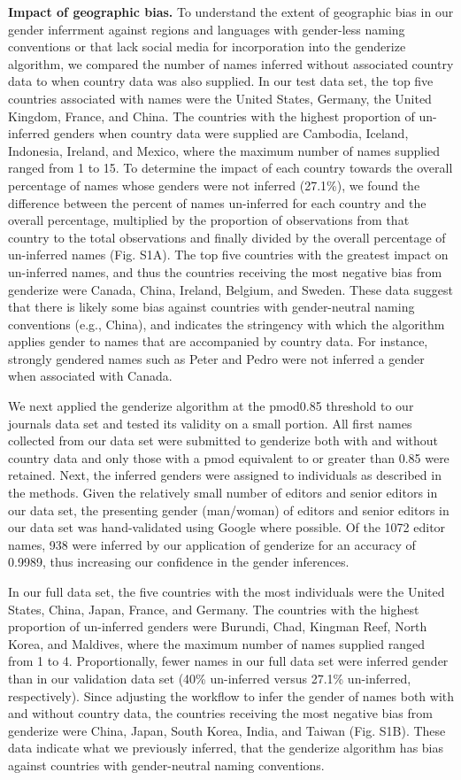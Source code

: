 \documentclass[11pt,]{article}
\begin{document}
\textbf{Impact of geographic bias.} To understand the extent of
geographic bias in our gender inferrment against regions and languages
with gender-less naming conventions or that lack social media for
incorporation into the genderize algorithm, we compared the number of
names inferred without associated country data to when country data was
also supplied. In our test data set, the top five countries associated
with names were the United States, Germany, the United Kingdom, France,
and China. The countries with the highest proportion of un-inferred
genders when country data were supplied are Cambodia, Iceland,
Indonesia, Ireland, and Mexico, where the maximum number of names
supplied ranged from 1 to 15. To determine the impact of each country
towards the overall percentage of names whose genders were not inferred
(27.1\%), we found the difference between the percent of names
un-inferred for each country and the overall percentage, multiplied by
the proportion of observations from that country to the total
observations and finally divided by the overall percentage of
un-inferred names (Fig. S1A). The top five countries with the greatest
impact on un-inferred names, and thus the countries receiving the most
negative bias from genderize were Canada, China, Ireland, Belgium, and
Sweden. These data suggest that there is likely some bias against
countries with gender-neutral naming conventions (e.g., China), and
indicates the stringency with which the algorithm applies gender to
names that are accompanied by country data. For instance, strongly
gendered names such as Peter and Pedro were not inferred a gender when
associated with Canada.

We next applied the genderize algorithm at the pmod0.85 threshold to our
journals data set and tested its validity on a small portion. All first
names collected from our data set were submitted to genderize both with
and without country data and only those with a pmod equivalent to or
greater than 0.85 were retained. Next, the inferred genders were
assigned to individuals as described in the methods. Given the
relatively small number of editors and senior editors in our data set,
the presenting gender (man/woman) of editors and senior editors in our
data set was hand-validated using Google where possible. Of the 1072
editor names, 938 were inferred by our application of genderize for an
accuracy of 0.9989, thus increasing our confidence in the gender
inferences.

In our full data set, the five countries with the most individuals were
the United States, China, Japan, France, and Germany. The countries with
the highest proportion of un-inferred genders were Burundi, Chad,
Kingman Reef, North Korea, and Maldives, where the maximum number of
names supplied ranged from 1 to 4. Proportionally, fewer names in our
full data set were inferred gender than in our validation data set (40\%
un-inferred versus 27.1\% un-inferred, respectively). Since adjusting
the workflow to infer the gender of names both with and without country
data, the countries receiving the most negative bias from genderize were
China, Japan, South Korea, India, and Taiwan (Fig. S1B). These data
indicate what we previously inferred, that the genderize algorithm has
bias against countries with gender-neutral naming conventions.
\end{document}
